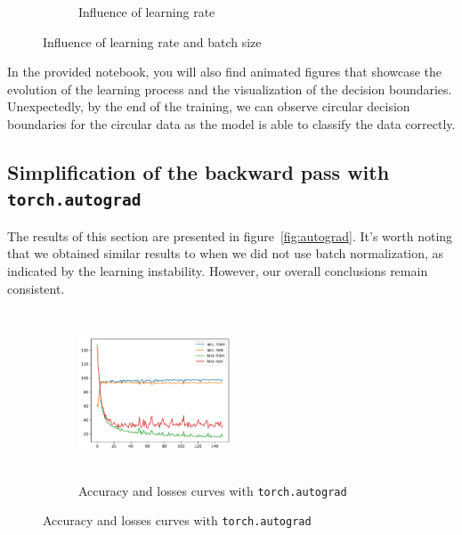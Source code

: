 \begin{figure}[H]
\begin{subfigure}{0.45\textwidth}
        \caption{Influence of learning rate}
        \label{subfig:manual_lr}
    \end{subfigure}
    \caption{Influence of learning rate and batch size}
    \label{fig:manual_bs_lr}
\end{figure}

In the provided notebook, you will also find animated figures that showcase the evolution of the learning process and the visualization of the decision boundaries. Unexpectedly, by the end of the training, we can observe circular decision boundaries for the circular data as the model is able to classify the data correctly.

\subsection{Simplification of the backward pass with \texttt{torch.autograd}}

The results of this section are presented in figure~\ref{fig:autograd}. It's worth noting that we obtained similar results to when we did not use batch normalization, as indicated by the learning instability. However, our overall conclusions remain consistent.


\begin{figure}[H]
    \centering
    \begin{subfigure}{\textwidth}
        \centering
        \includegraphics[width=0.5\textwidth, height=5cm]{figs/NN/autograd_acc_loss.pdf}
        \caption{Accuracy and losses curves with \texttt{torch.autograd}}
        \label{subfig:autograd_acc_loss}
    \end{subfigure}
\end{figure}

